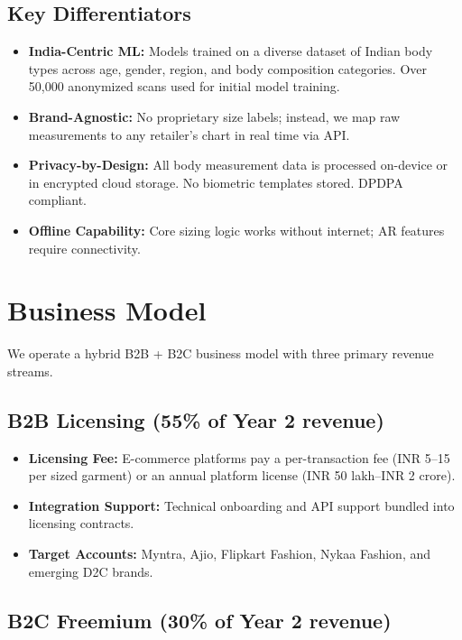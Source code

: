 \documentclass[12pt,a4paper]{article}
\begin{document}
\subsection{Key Differentiators}

\begin{itemize}
    \item \textbf{India-Centric ML:} Models trained on a diverse dataset of Indian body types across age, gender, region, and body composition categories. Over 50,000 anonymized scans used for initial model training.
    \item \textbf{Brand-Agnostic:} No proprietary size labels; instead, we map raw measurements to any retailer's chart in real time via API.
    \item \textbf{Privacy-by-Design:} All body measurement data is processed on-device or in encrypted cloud storage. No biometric templates stored. DPDPA compliant.
    \item \textbf{Offline Capability:} Core sizing logic works without internet; AR features require connectivity.
\end{itemize}

\section{Business Model}

We operate a hybrid B2B + B2C business model with three primary revenue streams.

\subsection{B2B Licensing (55\% of Year 2 revenue)}

\begin{itemize}
    \item \textbf{Licensing Fee:} E-commerce platforms pay a per-transaction fee (INR 5--15 per sized garment) or an annual platform license (INR 50 lakh--INR 2 crore).
    \item \textbf{Integration Support:} Technical onboarding and API support bundled into licensing contracts.
    \item \textbf{Target Accounts:} Myntra, Ajio, Flipkart Fashion, Nykaa Fashion, and emerging D2C brands.
\end{itemize}

\subsection{B2C Freemium (30\% of Year 2 revenue)}
\end{document}
